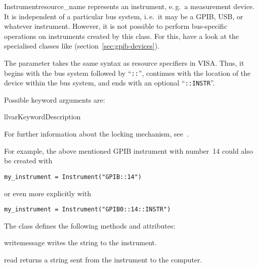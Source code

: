 \documentclass{howto}
\begin{document}
\begin{classdesc}{Instrument}{resource_name}
  represents an instrument, e.\,g.\ a measurement device.  It is independent of
  a particular bus system, i.\,e.\ it may be a GPIB, USB, or whatever
  instrument.  However, it is not possible to perform bus-specific operations
  on instruments created by this class.  For this, have a look at the
  specialised classes like 
  (section~\ref{sec:gpib-devices}).

  The parameter  takes the same syntax as resource
  specifiers in VISA\@.  Thus, it begins with the bus system followed by
  ``\verb|::|'', continues with the location of the device within the bus
  system, and ends with an optional ``\verb|::INSTR|''.

  Possible keyword arguments are:
  \begin{tableii}{ll}{var}{Keyword}{Description}
  \end{tableii}

  \vspace{1ex}
  For further information about the locking mechanism,
  see~.
\end{classdesc}

For example, the above mentioned GPIB instrument with number~14 could also be
created with
\begin{verbatim}
my_instrument = Instrument("GPIB::14")
\end{verbatim}
or even more explicitly with
\begin{verbatim}
my_instrument = Instrument("GPIB0::14::INSTR")
\end{verbatim}

The class  defines the following methods and attributes:

\begin{methoddesc}{write}{message}
  writes the string  to the instrument.
\end{methoddesc}

\begin{methoddesc}{read}{}
  returns a string sent from the instrument to the computer.
\end{methoddesc}
\end{document}
